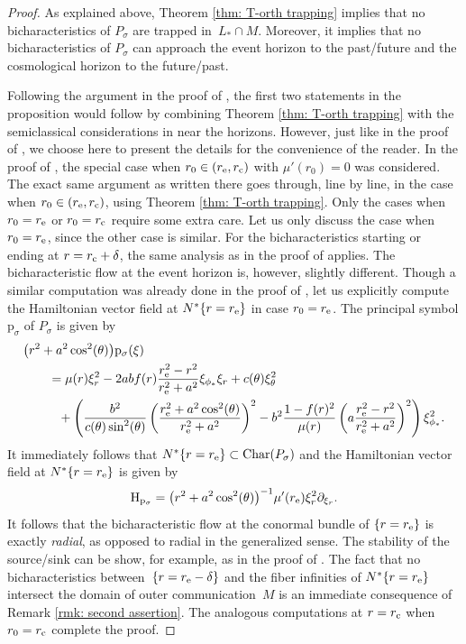 \documentclass[pdftex]{sigma}
\newcommand{\de}{\delta}
\renewcommand{\d}{\partial}
\renewcommand{\H}{\mathrm H}
\newcommand{\p}{\mathrm p}
\newcommand{\Char}{\mathrm{Char}}
\newcommand{\s}{\sigma}
\numberwithin{equation}{section}
\begin{document}
\begin{proof}
As explained above, Theorem \ref{thm: T-orth trapping} implies that no bicharacteristics of $P_\s$ are trapped in~${L_* \cap M}$.
Moreover, it implies that no bicharacteristics of $P_\s$ can approach the event horizon to the past/future and the cosmological horizon to the future/past.

Following the argument in the proof of \cite[Lemma~2.5]{PV2023}, the first two statements in the proposition would follow by combining Theorem \ref{thm: T-orth trapping} with the semiclassical considerations in \cite{V2013} near the horizons.
However, just like in the proof of \cite[Lemma~2.5]{PV2023}, we choose here to present the details for the convenience of the reader.
In the proof of \cite[Lemma~2.5]{PV2023}, the special case when $r_0 \in (r_{\rm e}, r_{\rm c})$ with $\mu'(r_0) = 0$ was considered.
The exact same argument as written there goes through, line by line, in the case when $r_0 \in (r_{\rm e}, r_{\rm c})$, using Theorem \ref{thm: T-orth trapping}.
Only the cases when $r_0 = r_{\rm e}$ or $r_0 = r_{\rm c}$ require some extra care.
Let us only discuss the case when $r_0 = r_{\rm e}$, since the other case is similar.
For the bicharacteristics starting or ending at $r = r_{\rm c} + \de$, the same analysis as in the proof of \cite[Lemma~2.5]{PV2023} applies.
The bicharacteristic flow at the event horizon is, however, slightly different.
Though a similar computation was already done in the proof of \cite[Theorem~1.7]{PV2021}, let us explicitly compute the Hamiltonian vector field at $N^*\{r = r_{\rm e}\}$ in case $r_0 = r_{\rm e}$.
The principal symbol $\p_\s$ of $P_\s$ is given by
\begin{align*}%
	&\big(r^2 + a^2\cos^2(\theta)\big)\p_\s(\xi) \\
		&\qquad= \mu(r) \xi_r^2 - 2 a b f(r) \frac{r_{\rm e}^2 - r^2}{r_{\rm e}^2 + a^2} \xi_{\phi_*} \xi_r + c(\theta) \xi_\theta^2 \\
		&\qquad\phantom{=}{} + \left( \frac{b^2}{c(\theta)\sin^2(\theta)}\left(\frac{r_{\rm e}^2 + a^2 \cos^2(\theta)}{r_{\rm e}^2 + a^2} \right)^2 - b^2 \frac{1 - f(r)^2}{\mu(r)} \left(a \frac{r_{\rm e}^2 - r^2}{r_{\rm e}^2 + a^2} \right)^2 \right) \xi_{\phi_*}^2.
\end{align*}
It immediately follows that $N^*\{r = r_{\rm e}\} \subset \Char(P_\s)$ and the Hamiltonian vector field at ${N^*\{r = r_{\rm e}\}}$ is given by
\[
	\H_{\p_\s}
		= \big(r^2 + a^2\cos^2(\theta)\big)^{-1} \mu'(r_{\rm e}) \xi_r^2 \d_{\xi_r}.
\]
It follows that the bicharacteristic flow at the conormal bundle of $\{r = r_{\rm e}\}$ is exactly \emph{radial}, as opposed to radial in the generalized sense.
The stability of the source/sink can be show, for example, as in the proof of \cite[Lemma~2.5]{PV2023}.
The fact that no bicharacteristics between~${\{r = r_{\rm e} - \de\}}$ and the fiber infinities of $N^*\{r = r_{\rm e}\}$ intersect the domain of outer communication~$M$ is an immediate consequence of Remark \ref{rmk: second assertion}.
The analogous computations at $r = r_{\rm c}$ when $r_0 = r_{\rm c}$ complete the proof.
\end{proof}
\end{document}
